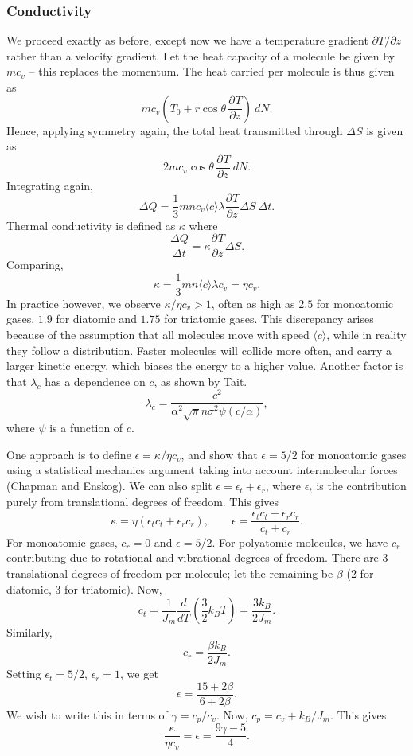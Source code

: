 \documentclass[11pt]{article}
\newcommand\dd[3][]{\frac{d^{#1}{#2}}{d {#3}^{#1}}}
\newcommand\pp[3][]{\frac{\partial^{#1}{#2}}{\partial {#3}^{#1}}}
\newcommand\E[1]{\langle #1 \rangle}
\theoremstyle{definition}
\theoremstyle{remark}
\numberwithin{equation}{section}
\begin{document}
    \subsubsection{Conductivity}
    We proceed exactly as before, except now we have a temperature gradient
    $\partial T / \partial z$ rather than a velocity gradient. Let the heat capacity
    of a molecule be given by $mc_v$ -- this replaces the momentum. The heat carried
    per molecule is thus given as \[
        mc_v\left(T_0 + r\cos\theta\,\pp{T}{z}\right)\:dN.
    \] Hence, applying symmetry again, the total heat transmitted through $\Delta S$
    is given as \[
        2mc_v\cos\theta\,\pp{T}{z}\:dN.
    \] Integrating again, \[
        \Delta Q = \frac{1}{3}mnc_v\E{c}\lambda \pp{T}{z}\Delta S\:\Delta t.
    \] Thermal conductivity is defined as $\kappa$ where \[
        \frac{\Delta Q}{\Delta t} = \kappa \pp{T}{z}\Delta S.
    \] Comparing, \[
        \kappa = \frac{1}{3}mn\E{c}\lambda c_v = \eta c_v.
    \] In practice however, we observe $\kappa / \eta c_v > 1$, often as high as
    $2.5$ for monoatomic gases, $1.9$ for diatomic and $1.75$ for triatomic gases.
    This discrepancy arises because of the assumption that all molecules move with
    speed $\E{c}$, while in reality they follow a distribution. Faster molecules
    will collide more often, and carry a larger kinetic energy, which biases the
    energy to a higher value. Another factor is that $\lambda_c$ has a dependence on
    $c$, as shown by Tait. \[
        \lambda_c = \frac{c^2}{\alpha^2\sqrt{\pi}n\sigma^2\psi(c / \alpha)},
    \] where $\psi$ is a function of $c$.

    One approach is to define $\epsilon = \kappa/\eta c_v$, and show that
    $\epsilon = 5 / 2$ for monoatomic gases using a statistical mechanics argument
    taking into account intermolecular forces (Chapman and Enskog). We can also
    split $\epsilon = \epsilon_t + \epsilon_r$, where $\epsilon_t$ is the
    contribution purely from translational degrees of freedom. This gives \[
        \kappa = \eta(\epsilon_tc_t + \epsilon_rc_r), \qquad 
        \epsilon = \frac{\epsilon_tc_t + \epsilon_rc_r}{c_t + c_r}.
    \] For monoatomic gases, $c_r = 0$ and $\epsilon = 5 /2$. For polyatomic
    molecules, we have $c_r$ contributing due to rotational and vibrational degrees
    of freedom. There are $3$ translational degrees of freedom per molecule; let the
    remaining be $\beta$ ($2$ for diatomic, $3$ for triatomic). Now, \[
        c_t = \frac{1}{J_m}\dd{}{T}\left(\frac{3}{2}k_BT\right) = \frac{3k_B}{2J_m}.
    \] Similarly, \[
        c_r = \frac{\beta k_B}{2J_m}.
    \] Setting $\epsilon_t = 5 / 2$, $\epsilon_r = 1$, we get \[
        \epsilon = \frac{15 + 2\beta}{6 + 2\beta}.
    \] We wish to write this in terms of $\gamma = c_p / c_v$. Now, $c_p = c_v + k_B
    / J_m$. This gives \[
        \frac{\kappa}{\eta c_v} = \epsilon = \frac{9\gamma - 5}{4}.
    \] 
\end{document}
